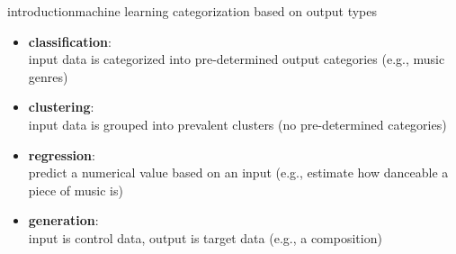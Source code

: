         \begin{frame}{introduction}{machine learning categorization based on output types}
            \begin{itemize}
                \item \textbf{classification}:\\ input data is categorized into pre-determined output categories (e.g., music genres)
                \smallskip
                \item \textbf{clustering}:\\ input data is grouped into prevalent clusters (no pre-determined categories)
                \smallskip
                \item \textbf{regression}:\\ predict a numerical value based on an input (e.g., estimate how danceable a piece of music is)
                \smallskip
                \item \textbf{generation}:\\ input is control data, output is target data (e.g., a composition)
            \end{itemize}
        \end{frame}
        
